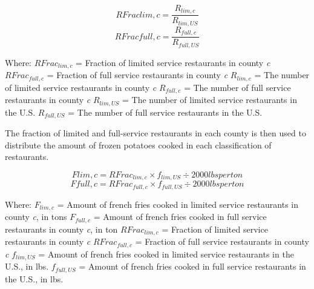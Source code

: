 \documentclass[
  11pt,
  oneside]{book}
\begin{document}
\begin{equation} 
  RFrac{lim,c} = \frac{R_{lim,c}}{R_{lim,US}}
  \label{eq:limited-county}
\end{equation}
\begin{equation} 
  RFrac{full,c} = \frac{R_{full,c}}{R_{full,US}}
  \label{eq:full-county}
\end{equation}

Where: \newline
\(RFrac_{lim,c}\) = Fraction of limited service restaurants in county \emph{c} \newline
\(RFrac_{full,c}\) = Fraction of full service restaurants in county \emph{c} \newline
\(R_{lim,c}\) = The number of limited service restaurants in county \emph{c} \newline
\(R_{full,c}\) = The number of full service restaurants in county \emph{c} \newline
\(R_{lim,US}\) = The number of limited service restaurants in the U.S. \newline
\(R_{full,US}\) = The number of full service restaurants in the U.S. \newline

The fraction of limited and full-service restaurants in each county is then used to distribute the amount of frozen potatoes cooked in each classification of restaurants.

\begin{equation} 
  F{lim,c} = RFrac_{lim,c} \times f_{lim,US} \div 2000 lbs per ton
  \label{eq:FF-limited-county}
\end{equation}
\begin{equation} 
  F{full,c} = RFrac_{full,c} \times f_{full,US} \div 2000 lbs per ton
  \label{eq:FF-full-county}
\end{equation}

Where: \newline
\(F_{lim,c}\) = Amount of french fries cooked in limited service restaurants in county \emph{c}, in tons \newline
\(F_{full,c}\) = Amount of french fries cooked in full service restaurants in county \emph{c}, in ton \newline
\(RFrac_{lim,c}\) = Fraction of limited service restaurants in county \emph{c} \newline
\(RFrac_{full,c}\) = Fraction of full service restaurants in county \emph{c} \newline
\(f_{lim,US}\) = Amount of french fries cooked in limited service restaurants in the U.S., in lbs. \newline
\(f_{full,US}\) = Amount of french fries cooked in full service restaurants in the U.S., in lbs. \newline
\end{document}
